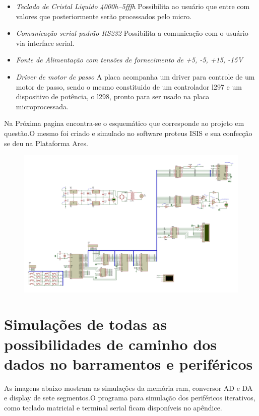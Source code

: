 \documentclass{Fabiano_file}
\begin{document}
\begin{itemize}
 \item \textit{Teclado de Cristal Liquido 4000h--5fffh} Possibilita ao usuário que entre com valores que posteriormente serão processados pelo micro.
 
 \item \textit{Comunicação serial padrão RS232} Possibilita a comunicação com o usuário via interface serial.
 
 \item \textit{Fonte de Alimentação com tensões de fornecimento de +5, -5, +15, -15V}
 
 \item \textit{Driver de motor de passo} A placa acompanha um driver para controle de um motor de passo, sendo o mesmo constituido de um controlador l297 e um
 dispositivo de potência, o l298, pronto para ser usado na placa microprocessada.
 \end{itemize}
 
 Na Próxima pagina encontra-se o esquemático que corresponde ao projeto em questão.O mesmo foi criado e simulado no software proteus ISIS e sua confecção se deu 
 na Plataforma Ares.
 
  
 	\newpage
	\clearpage
	\begin{figure}
		\centering
		\includegraphics[width=1\linewidth]{projeto_dispositivos_decodificados}
		\label{fig:adc_dac_ideal}
	\end{figure}
	\newpage


\section{Simulações de todas as possibilidades de caminho dos dados no barramentos e periféricos}
As imagens abaixo mostram as simulações da memória ram, conversor AD e DA e display de sete segmentos.O programa para simulação dos periféricos iterativos, como
teclado matricial e terminal serial ficam disponíveis no apêndice.
\end{document}
